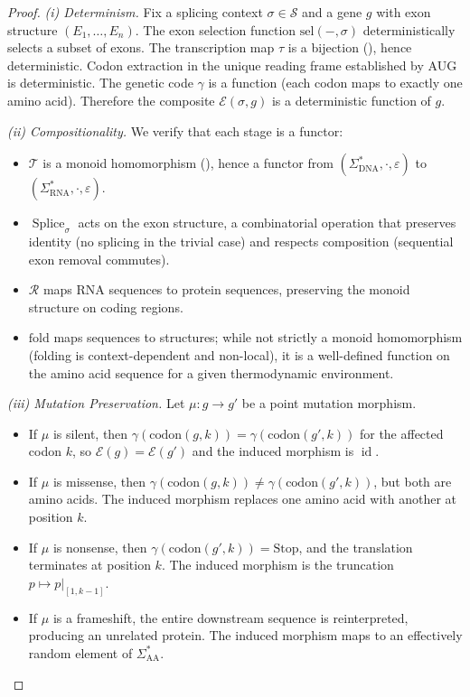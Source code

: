 \documentclass[12pt,a4paper]{article}
\theoremstyle{definition}
\newcommand{\id}{\operatorname{id}}
\newcommand{\Splice}{\operatorname{Splice}}
\begin{document}
\begin{proof}
\emph{(i) Determinism.} Fix a splicing context $\sigma \in \mathcal{S}$ and a gene $g$ with exon structure $(E_1, \ldots, E_n)$. The exon selection function $\mathrm{sel}(-, \sigma)$ deterministically selects a subset of exons. The transcription map $\tau$ is a bijection (), hence deterministic. Codon extraction in the unique reading frame established by AUG is deterministic. The genetic code $\gamma$ is a function (each codon maps to exactly one amino acid). Therefore the composite $\mathcal{E}(\sigma, g)$ is a deterministic function of $g$.

\emph{(ii) Compositionality.} We verify that each stage is a functor:
\begin{itemize}
  \item $\mathcal{T}$ is a monoid homomorphism (), hence a functor from $(\Sigma_\mathrm{DNA}^*, \cdot, \varepsilon)$ to $(\Sigma_\mathrm{RNA}^*, \cdot, \varepsilon)$.
  \item $\Splice_\sigma$ acts on the exon structure, a combinatorial operation that preserves identity (no splicing in the trivial case) and respects composition (sequential exon removal commutes).
  \item $\mathcal{R}$ maps RNA sequences to protein sequences, preserving the monoid structure on coding regions.
  \item $\mathrm{fold}$ maps sequences to structures; while not strictly a monoid homomorphism (folding is context-dependent and non-local), it is a well-defined function on the amino acid sequence for a given thermodynamic environment.
\end{itemize}

\emph{(iii) Mutation Preservation.} Let $\mu : g \to g'$ be a point mutation morphism.
\begin{itemize}
  \item If $\mu$ is silent, then $\gamma(\mathrm{codon}(g, k)) = \gamma(\mathrm{codon}(g', k))$ for the affected codon $k$, so $\mathcal{E}(g) = \mathcal{E}(g')$ and the induced morphism is $\id$.
  \item If $\mu$ is missense, then $\gamma(\mathrm{codon}(g, k)) \neq \gamma(\mathrm{codon}(g', k))$, but both are amino acids. The induced morphism replaces one amino acid with another at position $k$.
  \item If $\mu$ is nonsense, then $\gamma(\mathrm{codon}(g', k)) = \text{Stop}$, and the translation terminates at position $k$. The induced morphism is the truncation $p \mapsto p|_{[1,k-1]}$.
  \item If $\mu$ is a frameshift, the entire downstream sequence is reinterpreted, producing an unrelated protein. The induced morphism maps to an effectively random element of $\Sigma_\mathrm{AA}^*$. \qedhere
\end{itemize}
\end{proof}
\end{document}
